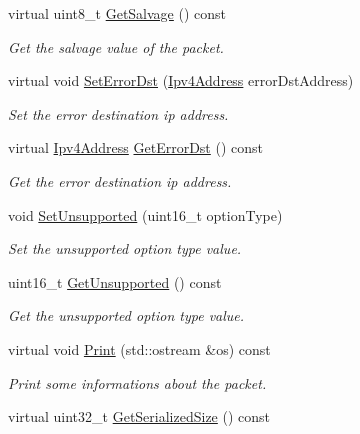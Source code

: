 \begin{DoxyCompactItemize}
virtual uint8\+\_\+t \hyperlink{classns3_1_1dsr_1_1DsrOptionRerrUnsupportHeader_a64bfc7c94aeadefc67dd2fa1a4b1a50d}{Get\+Salvage} () const 
\begin{DoxyCompactList}\small\item\em Get the salvage value of the packet. \end{DoxyCompactList}\item 
virtual void \hyperlink{classns3_1_1dsr_1_1DsrOptionRerrUnsupportHeader_aab1073700c8b13d9cf2e558a5c7b407c}{Set\+Error\+Dst} (\hyperlink{classns3_1_1Ipv4Address}{Ipv4\+Address} error\+Dst\+Address)
\begin{DoxyCompactList}\small\item\em Set the error destination ip address. \end{DoxyCompactList}\item 
virtual \hyperlink{classns3_1_1Ipv4Address}{Ipv4\+Address} \hyperlink{classns3_1_1dsr_1_1DsrOptionRerrUnsupportHeader_a9b1726f6edb6cc0d77e33ac6504871fb}{Get\+Error\+Dst} () const 
\begin{DoxyCompactList}\small\item\em Get the error destination ip address. \end{DoxyCompactList}\item 
void \hyperlink{classns3_1_1dsr_1_1DsrOptionRerrUnsupportHeader_a40148b0aa9b737a05c8e22daf7611c9f}{Set\+Unsupported} (uint16\+\_\+t option\+Type)
\begin{DoxyCompactList}\small\item\em Set the unsupported option type value. \end{DoxyCompactList}\item 
uint16\+\_\+t \hyperlink{classns3_1_1dsr_1_1DsrOptionRerrUnsupportHeader_aef01dab340250219b11cf11f7384ecf1}{Get\+Unsupported} () const 
\begin{DoxyCompactList}\small\item\em Get the unsupported option type value. \end{DoxyCompactList}\item 
virtual void \hyperlink{classns3_1_1dsr_1_1DsrOptionRerrUnsupportHeader_aa5f1fb1e3f4f2772f6e39955d2941153}{Print} (std\+::ostream \&os) const 
\begin{DoxyCompactList}\small\item\em Print some informations about the packet. \end{DoxyCompactList}\item 
virtual uint32\+\_\+t \hyperlink{classns3_1_1dsr_1_1DsrOptionRerrUnsupportHeader_a49bd3dfefecf0c2768d95c71d8afc2d5}{Get\+Serialized\+Size} () const 

\end{DoxyCompactItemize}
